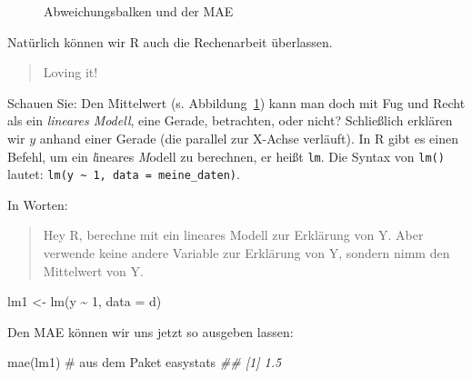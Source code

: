 \documentclass[
  letterpaper,
  twoside,
  open=any]{scrbook}
\newenvironment{Shaded}{\begin{snugshade}}{\end{snugshade}}
\newcommand{\AttributeTok}[1]{\textcolor[rgb]{0.40,0.45,0.13}{#1}}
\newcommand{\CommentTok}[1]{\textcolor[rgb]{0.37,0.37,0.37}{#1}}
\newcommand{\DecValTok}[1]{\textcolor[rgb]{0.68,0.00,0.00}{#1}}
\newcommand{\DocumentationTok}[1]{\textcolor[rgb]{0.37,0.37,0.37}{\textit{#1}}}
\newcommand{\FunctionTok}[1]{\textcolor[rgb]{0.28,0.35,0.67}{#1}}
\newcommand{\NormalTok}[1]{\textcolor[rgb]{0.00,0.23,0.31}{#1}}
\newcommand{\OtherTok}[1]{\textcolor[rgb]{0.00,0.23,0.31}{#1}}
\newcommand{\SpecialCharTok}[1]{\textcolor[rgb]{0.37,0.37,0.37}{#1}}
\theoremstyle{definition}
\theoremstyle{definition}
\theoremstyle{definition}
\theoremstyle{remark}
\begin{document}
\begin{figure}


\caption{\label{fig-mae}Abweichungsbalken und der MAE}

\end{figure}%

Natürlich können wir R auch die Rechenarbeit überlassen.

\begin{quote}
{} Loving it!
\end{quote}

Schauen Sie: Den Mittelwert (s. Abbildung~\ref{fig-mae}) kann man doch
mit Fug und Recht als ein \emph{lineares Modell}, eine Gerade,
betrachten, oder nicht? Schließlich erklären wir \(y\) anhand einer
Gerade (die parallel zur X-Achse verläuft). In R gibt es einen Befehl,
um ein \emph{l}ineares \emph{M}odell zu berechnen, er heißt \texttt{lm}.
Die Syntax von \texttt{lm()} lautet:
\texttt{lm(y\ \textasciitilde{}\ 1,\ data\ =\ meine\_daten)}.

In Worten:

\begin{quote}
Hey R, berechne mit ein lineares Modell zur Erklärung von Y. Aber
verwende keine andere Variable zur Erklärung von Y, sondern nimm den
Mittelwert von Y.
\end{quote}

\begin{Shaded}
\begin{Highlighting}[]
\NormalTok{lm1 }\OtherTok{\textless{}{-}} \FunctionTok{lm}\NormalTok{(y }\SpecialCharTok{\textasciitilde{}} \DecValTok{1}\NormalTok{, }\AttributeTok{data =}\NormalTok{ d)}
\end{Highlighting}
\end{Shaded}

Den MAE können wir uns jetzt so ausgeben lassen:

\begin{Shaded}
\begin{Highlighting}[]
\FunctionTok{mae}\NormalTok{(lm1)  }\CommentTok{\# aus dem Paket easystats}
\DocumentationTok{\#\# [1] 1.5}
\end{Highlighting}
\end{Shaded}
\end{document}

